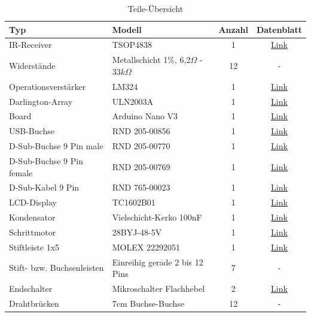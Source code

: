 \documentclass[11pt, titlepage]{report}
\begin{document}
			\hspace{5em}
			\begin{table}[htbp]
				\centering
				\caption{Teile-Übersicht}
				\begin{tabular}{llcc}
					\toprule
					\textbf{Typ} & \textbf{Modell} & \textbf{Anzahl} & \textbf{Datenblatt} \\
					\midrule
					IR-Receiver 			& TSOP4838 			& 1 & \href{https://cdn-reichelt.de/documents/datenblatt/A500/TSOP48XX.PDF}{Link} \\
					Widerstände 			& Metallschicht 1\%, 6,2$\Omega$ - 33$k\Omega$ & 12 & - \\
					Operationsverstärker 	& LM324 			& 1 &  \href{http://www.bonafidecn.com/PDF/UTC/OP\%20Amplifiers/LM324.pdf}{Link}\\
					Darlington-Array		& ULN2003A 			& 1 & \href{https://cdn-reichelt.de/documents/datenblatt/A200/ULN2001A_ULN2002A_ULN2003A_ULN2004A\%23STM.pdf}{Link} \\
					Board					& Arduino Nano V3 	& 1 & \href{https://www.arduino.cc/en/uploads/Main/ArduinoNanoManual23.pdf}{Link} \\
					USB-Buchse 				& RND 205-00856 	& 1 & \href{https://cdn-reichelt.de/documents/datenblatt/C300/RND\%20205-00856_ENG_TDS.pdf}{Link}\\
					D-Sub-Buchse 9 Pin male & RND 205-00770		& 1 & \href{https://cdn-reichelt.de/documents/datenblatt/C300/RND\%20205-00770_ENG_TDS.pdf}{Link}\\
					D-Sub-Buchse 9 Pin female & RND 205-00769 	& 1 & \href{https://cdn-reichelt.de/documents/datenblatt/C120/RND_205-00769_ENG_TDS.pdf}{Link}\\
					D-Sub-Kabel 9 Pin 		& RND 765-00023		& 1 & \href{https://cdn-reichelt.de/documents/datenblatt/C610/RND_765-00022_00027_DB-EN.pdf}{Link}\\
					LCD-Display				& TC1602B01			& 1 & \href{https://github.com/derTino89/RotaCon/blob/master/Datenbl\%C3\%A4tter/LCD1602.pdf}{Link}\\
					Kondensator 			& Vielschicht-Kerko 100nF & 1 & \href{https://cdn-reichelt.de/documents/datenblatt/B300/HITANO-S-SERIES_ENG_TDS.pdf}{Link}\\
					Schrittmotor			& 28BYJ-48-5V		& 1 & \href{https://www.digikey.at/de/datasheets/mikroelektronika/mikroelektronika-step-motor-5v-28byj48-datasheet}{Link}\\
					Stiftleiste 1x5 		& MOLEX 22292051	& 1 & \href{https://cdn-reichelt.de/documents/datenblatt/C160/04380804.pdf}{Link}\\
					Stift- bzw. Buchsenleisten	& Einreihig gerade 2 bis 12 Pins & 7 & - \\
					Endschalter				& Mikroschalter Flachhebel & 2 &\href{https://cdn-reichelt.de/documents/datenblatt/C200/AVX3_DB_EN.pdf}{Link}\\
					Drahtbrücken			& 7cm Buchse-Buchse	& 12 & -\\

				\end{tabular}
			\end{table}			
			
\end{document}
